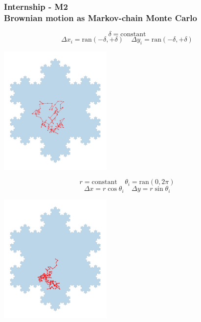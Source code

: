 \documentclass[9pt]{beamer}
\newcommand{\fives}{\ \ \ \ \ }
\newcommand{\mrm}{\mathrm}
\newcommand{\tbf}{\textbf}
\newcommand{\dlt}{\delta}
\newcommand{\Dlt}{\Delta}
\newcommand{\tta}{\theta}
\begin{document}
\begin{frame}
\frametitle{\tbf{Internship - M2} \\
\small{Brownian motion as Markov-chain Monte Carlo}}

    \begin{minipage}{0.48\linewidth}
    	$$ \dlt = \mrm{constant} $$
        $$ \Dlt x_i = \mrm{ran}(-\dlt,+\dlt) \fives \Dlt y_i = \mrm{ran}(-\dlt,+\dlt) $$
    \begin{center}
    	\includegraphics[height=6.4cm]{figs/diffuse_MCMC.png}
    \end{center}
    \end{minipage}
    \begin{minipage}{0.48\linewidth}
        $$ r = \mrm{constant} \fives \tta_i = \mrm{ran}(0,2\pi) $$
        $$ \Dlt x = r \cos\tta_i \fives \Dlt y = r \sin\tta_i $$
    \begin{center}
		\includegraphics[height=6.4cm]{figs/diffuse_req.png}
    \end{center}
    \end{minipage}


\end{frame}
\end{document}
